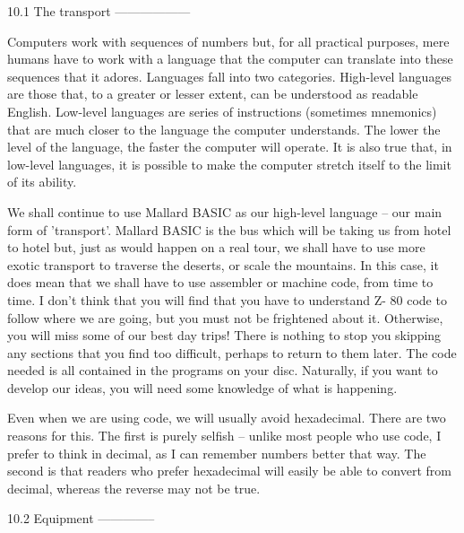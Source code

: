 10.1 The transport
------------------

Computers work with sequences of numbers but, for all practical purposes, mere 
humans have to work with a language that the computer can translate into these 
sequences  that  it  adores. Languages fall into  two  categories.  High-level 
languages are those that, to a greater or lesser extent, can be understood  as 
readable  English. Low-level languages are series of  instructions  (sometimes 
mnemonics) that are much closer to the language the computer understands.  The 
lower  the level of the language, the faster the computer will operate. It  is 
also  true that, in low-level languages, it is possible to make  the  computer 
stretch itself to the limit of its ability.

We shall continue to use Mallard BASIC as our high-level language -- our  main 
form  of  'transport'. Mallard BASIC is the bus which will be taking  us  from 
hotel to hotel but, just as would happen on a real tour, we shall have to  use 
more exotic transport to traverse the deserts, or scale the mountains. In this 
case,  it does mean that we shall have to use assembler or machine code,  from 
time to time. I don't think that you will find that you have to understand  Z-
80 code to follow where we are going, but you must not be frightened about it. 
Otherwise, you will miss some of our best day trips! There is nothing to  stop 
you  skipping any sections that you find too difficult, perhaps to  return  to 
them  later.  The code needed is all contained in the programs on  your  disc. 
Naturally,  if you want to develop our ideas, you will need some knowledge  of 
what is happening.

Even when we are using code, we will usually avoid hexadecimal. There are  two 
reasons  for this. The first is purely selfish -- unlike most people  who  use 
code, I prefer to think in decimal, as I can remember numbers better that way. 
The  second  is  that readers who prefer hexadecimal will easily  be  able  to 
convert from decimal, whereas the reverse may not be true.


10.2 Equipment
--------------

